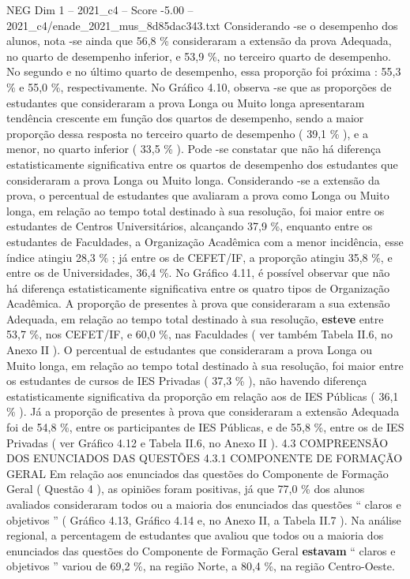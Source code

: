 \begin{textsample}{NEG Dim 1 – 2021\_c4 – Score -5.00 – 2021\_c4/enade\_2021\_mus\_8d85dac343.txt}
Considerando -se o desempenho dos alunos, nota -se ainda que 56,8 \% consideraram a extensão da prova Adequada, no quarto de desempenho inferior, e 53,9 \%, no terceiro quarto de desempenho.
No segundo e no último quarto de desempenho, essa proporção foi próxima : 55,3 \% e 55,0 \%, respectivamente.
No Gráfico 4.10, observa -se que as proporções de estudantes que consideraram a prova Longa ou Muito longa apresentaram tendência crescente em função dos quartos de desempenho, sendo a maior proporção dessa resposta no terceiro quarto de desempenho ( 39,1 \% ), e a menor, no quarto inferior ( 33,5 \% ).
Pode -se constatar que não há diferença estatisticamente significativa entre os quartos de desempenho dos estudantes que consideraram a prova Longa ou Muito longa.
Considerando -se a extensão da prova, o percentual de estudantes que avaliaram a prova como Longa ou Muito longa, em relação ao tempo total destinado à sua resolução, foi maior entre os estudantes de Centros Universitários, alcançando 37,9 \%, enquanto entre os estudantes de Faculdades, a Organização Acadêmica com a menor incidência, esse índice atingiu 28,3 \% ; já entre os de CEFET/IF, a proporção atingiu 35,8 \%, e entre os de Universidades, 36,4 \%.
No Gráfico 4.11, é possível observar que não há diferença estatisticamente significativa entre os quatro tipos de Organização Acadêmica.
A proporção de presentes à prova que consideraram a sua extensão Adequada, em relação ao tempo total destinado à sua resolução, \textbf{esteve} entre 53,7 \%, nos CEFET/IF, e 60,0 \%, nas Faculdades ( ver também Tabela II.6, no Anexo II ).
O percentual de estudantes que consideraram a prova Longa ou Muito longa, em relação ao tempo total destinado à sua resolução, foi maior entre os estudantes de cursos de IES Privadas ( 37,3 \% ), não havendo diferença estatisticamente significativa da proporção em relação aos de IES Públicas ( 36,1 \% ).
Já a proporção de presentes à prova que consideraram a extensão Adequada foi de 54,8 \%, entre os participantes de IES Públicas, e de 55,8 \%, entre os de IES Privadas ( ver Gráfico 4.12 e Tabela II.6, no Anexo II ). 4.3 COMPREENSÃO DOS ENUNCIADOS DAS QUESTÕES 4.3.1 COMPONENTE DE FORMAÇÃO GERAL Em relação aos enunciados das questões do Componente de Formação Geral ( Questão 4 ), as opiniões foram positivas, já que 77,0 \% dos alunos avaliados consideraram todos ou a maioria dos enunciados das questões “ claros e objetivos ” ( Gráfico 4.13, Gráfico 4.14 e, no Anexo II, a Tabela II.7 ).
Na análise regional, a percentagem de estudantes que avaliou que todos ou a maioria dos enunciados das questões do Componente de Formação Geral \textbf{estavam} “ claros e objetivos ” variou de 69,2 \%, na região Norte, a 80,4 \%, na região Centro-Oeste.

\end{textsample}
